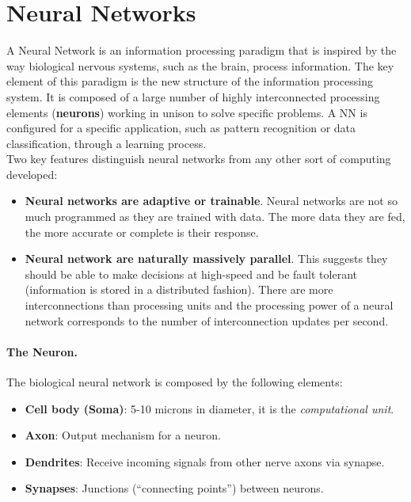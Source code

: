 \section{Neural Networks}
A Neural Network is an information processing paradigm that is inspired by the way biological nervous systems, such as the brain, process information. The key element of this paradigm is the new structure of the information processing system. It is composed of a large number of highly interconnected processing elements (\textbf{neurons}) working in unison to solve specific problems. A NN is configured for a specific application, such as pattern recognition or data classification, through a learning process.\\
Two key features distinguish neural networks from any other sort of computing developed:
\begin{itemize}
	\item \textbf{Neural networks are adaptive or trainable}. Neural networks are not so much programmed as they are trained with data. The more data they are fed, the more accurate or complete is their response.
	\item \textbf{Neural network are naturally massively parallel}. This suggests they should be able to make decisions at high-speed and be fault tolerant (information is stored in a distributed fashion). There are more interconnections than processing units and the processing power of a neural network corresponds to the number of interconnection updates per second. 
\end{itemize}

\paragraph*{The Neuron.} The biological neural network is composed by the following elements:
\begin{itemize}
	\item \textbf{Cell body (Soma)}: 5-10 microns in diameter, it is the \textit{computational unit}.
	\item \textbf{Axon}: Output mechanism for a neuron.
	\item \textbf{Dendrites}: Receive incoming signals from other nerve axons via synapse.
	\item \textbf{Synapses}: Junctions (``connecting points'') between neurons.
\end{itemize}

